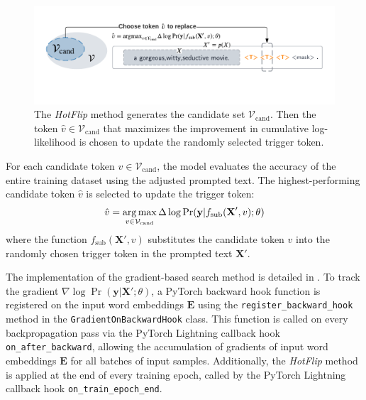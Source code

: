 \begin{figure}[!ht]
    \centering
    \includegraphics[width=\hsize]{figures/implementation_media/impl-auto-prompting.pdf}
    \caption{The \textit{HotFlip} method generates the candidate set $\mathcal{V}_{\text{cand}}$. Then the token $\hat{v} \in \mathcal{V}_{\text{cand}}$ that maximizes the improvement in cumulative log-likelihood is chosen to update the randomly selected trigger token.}
    \label{fig:impl-auto-prompt}
\end{figure}

For each candidate token $v \in \mathcal{V}_{\text{cand}}$, the model evaluates the accuracy of the entire training dataset using the adjusted prompted text. The highest-performing candidate token $\hat{v}$ is selected to update the trigger token:
\begin{equation}
    \hat{v} = \operatorname*{arg\,max}_{v \in \mathcal{V}_{\text{cand}}} \Delta \log \Pr(\textbf{y} | f_{\text{sub}}(\textbf{X}', v); \theta)
\end{equation}
where the function $f_{\text{sub}}(\textbf{X}', v)$ substitutes the candidate token $v$ into the randomly chosen trigger token in the prompted text $\textbf{X}'$. 

The implementation of the gradient-based search method is detailed in . To track the gradient $\nabla \log \Pr(\textbf{y} | \textbf{X}'; \theta)$, a PyTorch backward hook function is registered on the input word embeddings $\textbf{E}$ using the \texttt{register\_backward\_hook} method in the \texttt{GradientOnBackwardHook} class. This function is called on every backpropagation pass via the PyTorch Lightning callback hook \texttt{on\_after\_backward}, allowing the accumulation of gradients of input word embeddings $\textbf{E}$ for all batches of input samples. Additionally, the \textit{HotFlip} method is applied at the end of every training epoch, called by the PyTorch Lightning callback hook \texttt{on\_train\_epoch\_end}.

